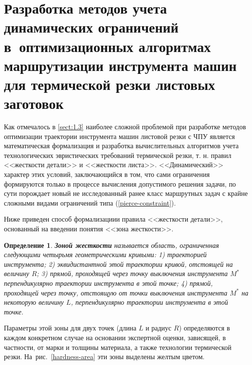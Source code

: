 \documentclass[11pt,twoside,openany]{report}
\newcounter{theo}
\newcounter{pred}
\newcounter{opred}
\newtheorem{opred}{Определение}[section]
\begin{document}
{\raggedright\section{
  Разработка методов учета динамических ограничений
  в~оптимизационных алгоритмах
  маршрутизации инструмента машин
  для термической резки листовых заготовок
}}
\label{sect:2.3}
\setcounter{equation}{0}

Как отмечалось в \ref{sect:1.3}
наиболее сложной проблемой при разработке методов оптимизации
траектории инструмента машин листовой резки с ЧПУ
является математическая формализация и
разработка вычислительных алгоритмов учета
технологических эвристических требований термической резки,
т. н. правил <<жесткости детали>>
и <<жесткости листа>>.
<<Динамический>> характер этих условий, заключающийся в том,
что сами ограничения формируются только в процессе вычисления
допустимого решения задачи, по сути порождает
новый не исследованный ранее класс маршрутных задач
с крайне сложными видами ограничений типа
(\ref{pierce-constraint}).

Ниже приведен способ формализациии правила <<жесткости детали>>,
основанный на введении понятия <<зона жесткости>>.

\begin{opred}
  {\bf Зоной жесткости}
  называется область,
  ограниченная следующими четырьмя геометрическими кривыми:
  1) траекторией инструмента;
  2) эквидистантной этой траектории кривой, отстоящей на величину $R$;
  3) прямой, проходящей через точку выключения инструмента $M^*$
  перпендикулярно траектории инструмента в этой точке;
  4) прямой, проходящей через точку,
  отстоящую от точки выключения инструмента $M^*$ на некоторую величину $L$,
  перпендикулярно траектории инструмента в этой точке.
\end{opred}

Параметры этой зоны для двух точек
(длина $L$ и радиус $R$)
определяются в каждом конкретном случае
на основании экспертной оценки,
зависящей, в частности, от марки и толщины материала,
а также технологии термической резки.
На~рис.~\ref{hardness-area}
эти зоны выделены желтым цветом.
\end{document}
